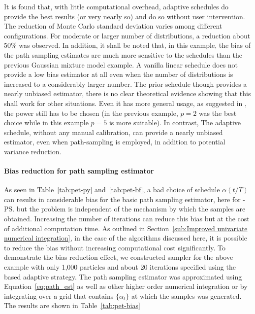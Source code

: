It is found that, with little computational overhead, adaptive schedules do
provide the best results (or very nearly so) and do so without user
intervention. The reduction of Monte Carlo standard deviation varies among
different configurations. For moderate or larger number of distributions, a
reduction about 50\% was observed. In addition, it shall be noted that, in
this example, the bias of the path sampling estimates are much more sensitive
to the schedules than the previous Gaussian mixture model example. A vanilla
linear schedule does not provide a low bias estimator at all even when the
number of distributions is increased to a considerably larger number. The
prior schedule though provides a nearly unbiased estimator, there is no clear
theoretical evidence showing that this shall work for other situations. Even
it has more general usage, as suggested in \cite{Calderhead:2009bd}, the power
still has to be chosen (in the previous \gmm example, $p = 2$ was the best
choice while in this \pet example $p = 5$ is more suitable). In contrast, The
adaptive schedule, without any manual calibration, can provide a nearly
unbiased estimator, even when path-sampling is employed, in addition to
potential variance reduction.

\paragraph{Bias reduction for path sampling estimator}



As seen in Table~\ref{tab:pet-py} and~\ref{tab:pet-bf}, a bad choice of
schedule $\alpha(t/T)$ can results in considerable bias for the basic path
sampling estimator, here for \smc[2]-\ps but the problem is independent of the
mechanism by which the samples are obtained. Increasing the number of
iterations can reduce this bias but at the cost of additional computation
time. As outlined in Section~\ref{sub:Improved univariate numerical
  integration}, in the case of the \smc algorithms discussed here, it is
possible to reduce the bias without increasing computational cost
significantly. To demonstrate the bias reduction effect, we constructed \smc
sampler for the above \pet example with only 1,000 particles and about 20
iterations specified using the \cess based adaptive strategy. The path
sampling estimator was approximated using Equation~\eqref{eq:path_est} as well
as other higher order numerical integration or by integrating over a grid that
contains $\{\alpha_t\}$ at which the samples was generated. The results are
shown in Table~\ref{tab:pet-bias}

